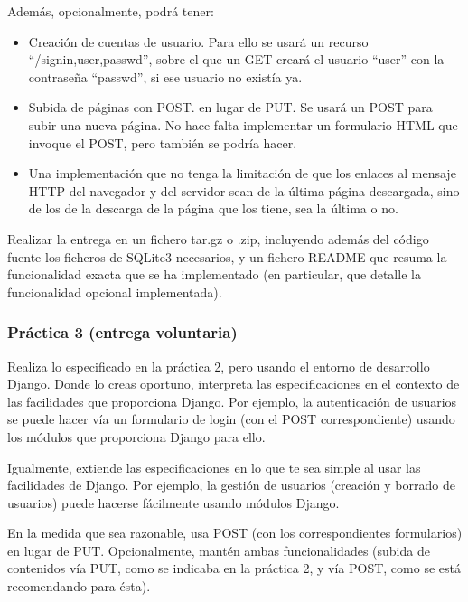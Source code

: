 Además, opcionalmente, podrá tener:

\begin{itemize}
\item Creación de cuentas de usuario. Para ello se usará un recurso ``/signin,user,passwd'', sobre el que un GET creará el usuario ``user'' con la contraseña ``passwd'', si ese usuario no existía ya.
\item Subida de páginas con POST. en lugar de PUT. Se usará un POST para subir una nueva página. No hace falta implementar un formulario HTML que invoque el POST, pero también se podría hacer.
\item Una implementación que no tenga la limitación de que los enlaces al mensaje HTTP del navegador y del servidor sean de la última página descargada, sino de los de la descarga de la página que los tiene, sea la última o no.
\end{itemize}

Realizar la entrega en un fichero tar.gz o .zip, incluyendo además del código fuente los ficheros de SQLite3 necesarios, y un fichero README que resuma la funcionalidad exacta que se ha implementado (en particular, que detalle la funcionalidad opcional implementada).

\subsubsection{Práctica 3 (entrega voluntaria)}
\label{subsec:practica-vol-3-2010}

Realiza lo especificado en la práctica 2, pero usando el entorno de desarrollo Django. Donde lo creas oportuno, interpreta las especificaciones en el contexto de las facilidades que proporciona Django. Por ejemplo, la autenticación de usuarios se puede hacer vía un formulario de login (con el POST correspondiente) usando los módulos que proporciona Django para ello.

Igualmente, extiende las especificaciones en lo que te sea simple al usar las facilidades de Django. Por ejemplo, la gestión de usuarios (creación y borrado de usuarios) puede hacerse fácilmente usando módulos Django.

En la medida que sea razonable, usa POST (con los correspondientes formularios) en lugar de PUT. Opcionalmente, mantén ambas funcionalidades (subida de contenidos vía PUT, como se indicaba en la práctica 2, y vía POST, como se está recomendando para ésta).

